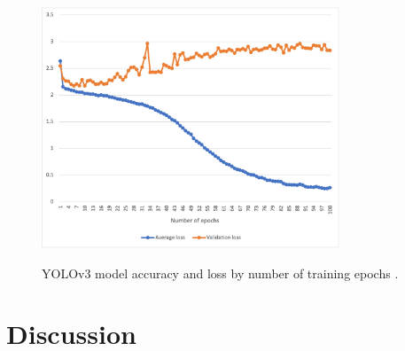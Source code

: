         





\begin{figure}
 \begin{center}
 \includegraphics[width=3.5in]{images/epochgraph.jpg}\\
 \caption{YOLOv3 model accuracy and loss by number of training epochs \cite{radiology_error}.}\label{fig:compare}
 \end{center}
\end{figure}

\section{Discussion}
